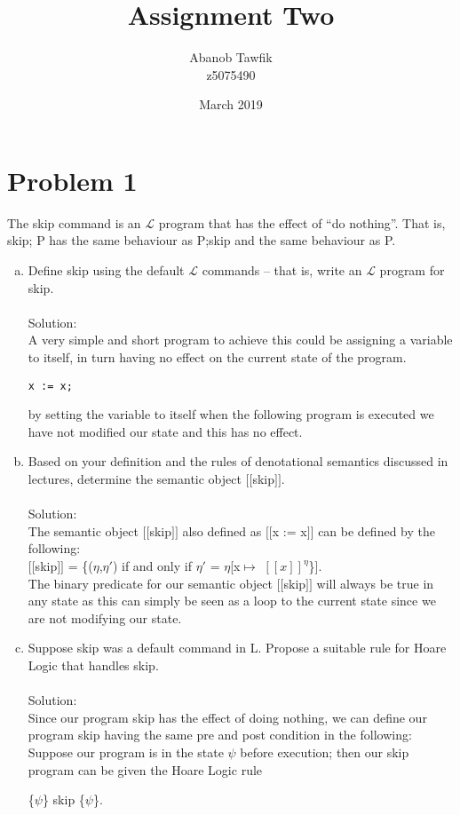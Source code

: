 \documentclass{article}
\title{Assignment Two}
\author{Abanob Tawfik\\z5075490}
\date{March 2019}
\newcommand*\moveToRight[1]{\hspace*{0em plus 1fill}\makebox{(#1)}}
\begin{document}
\maketitle
\section{Problem 1}
The skip command is an $\mathcal{L}$  program that has the effect of “do nothing”. That is, skip; P has the same behaviour as P;skip and the same behaviour as P.
\begin{enumerate}[(a)]
    \item Define skip using the default $\mathcal{L}$ commands – that is, write an $\mathcal{L}$ program for skip. \moveToRight{3 marks}\\\\
    Solution: \\
    A very simple and short program to achieve this could be assigning a variable to itself, in turn having no effect on the current state of the program.
    \begin{lstlisting}[language=Maple,mathescape=true]
x := x;
    \end{lstlisting}
    by setting the variable to itself when the following program is executed we have not modified our state and this has no effect. 
    
    \item Based on your definition and the rules of denotational semantics discussed in lectures, determine the semantic object $[\![$skip$]\!]$. \moveToRight{4 marks}\\\\
    Solution: \\
    The semantic object $[\![$skip$]\!]$ also defined as $[\![$x := x$]\!]$  can be defined by the following:\\
    $[\![$skip$]\!]$ = \{($\eta$,$\eta'$) if and only if $\eta'$ = $\eta$[x$\mapsto$ $[\![x]\!]^\eta$\}].\\
    The binary predicate for our semantic object $[\![$skip$]\!]$ will always be true in any state as this can simply be seen as a loop to the current state since we are not modifying our state.
    
    
    \item Suppose skip was a default command in L. Propose a suitable rule for Hoare Logic that handles skip. \moveToRight{3 marks}\\\\
    Solution: \\
    Since our program skip has the effect of doing nothing, we can define our program skip having the same pre and post condition in the following:\\
    Suppose our program is in the state $\psi$ before execution; then our skip program can be given the Hoare Logic rule
    \begin{center}
        \{$\psi$\} skip \{$\psi$\}.\\
    \end{center}
\end{enumerate}
\end{document}
